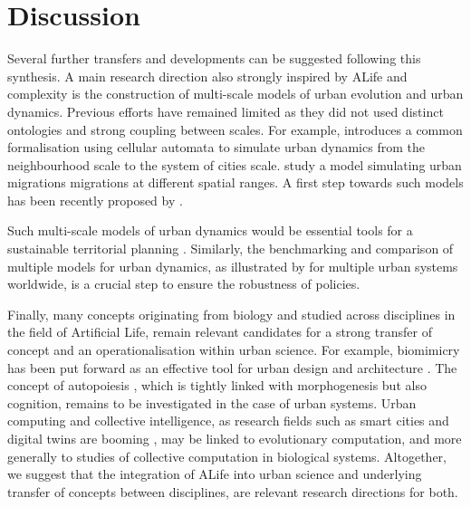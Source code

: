 \documentclass[letterpaper]{article}
\begin{document}
\section{Discussion}


Several further transfers and developments can be suggested following this synthesis. A main research direction also strongly inspired by ALife and complexity is the construction of multi-scale models of urban evolution and urban dynamics. Previous efforts have remained limited as they did not used distinct ontologies and strong coupling between scales. For example, \cite{batty2005agents} introduces a common formalisation using cellular automata to simulate urban dynamics from the neighbourhood scale to the system of cities scale. \cite{murcio2015urban} study a model simulating urban migrations migrations at different spatial ranges. A first step towards such models has been recently proposed by \cite{raimbault2021strong}.


Such multi-scale models of urban dynamics would be essential tools for a sustainable territorial planning \citep{rozenblat2018conclusion}. Similarly, the benchmarking and comparison of multiple models for urban dynamics, as illustrated by \cite{raimbault2020empowering} for multiple urban systems worldwide, is a crucial step to ensure the robustness of policies.

Finally, many concepts originating from biology and studied across disciplines in the field of Artificial Life, remain relevant candidates for a strong transfer of concept and an operationalisation within urban science. For example, biomimicry has been put forward as an effective tool for urban design and architecture \citep{taylor2017art}. The concept of autopoiesis \citep{bourgine2004autopoiesis}, which is tightly linked with morphogenesis but also cognition, remains to be investigated in the case of urban systems. Urban computing and collective intelligence, as research fields such as smart cities and digital twins are booming \citep{batty2018digital}, may be linked to evolutionary computation, and more generally to studies of collective computation in biological systems. Altogether, we suggest that the integration of ALife into urban science and underlying transfer of concepts between disciplines, are relevant research directions for both.




%


\footnotesize

\end{document}
